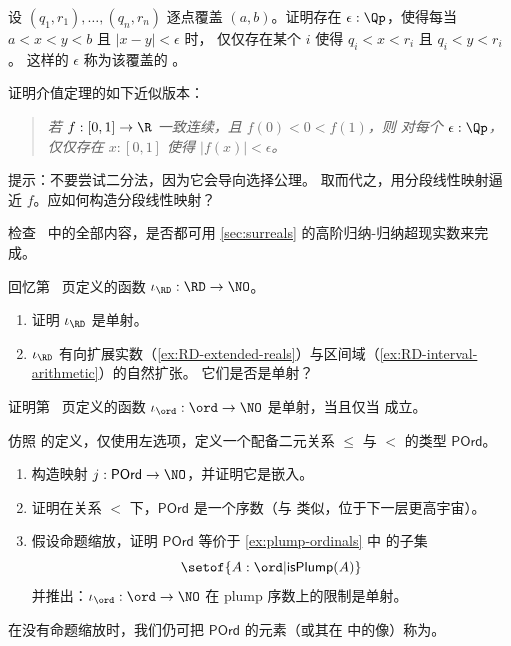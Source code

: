 \begin{ex} \label{ex:finite-cover-lebesgue-number}
  设 $(q_1, r_1), \ldots, (q_n, r_n)$ 逐点覆盖 $(a, b)$。证明存在
  $\epsilon : \Qp$，使得每当 $a < x < y < b$ 且 $|x - y| < \epsilon$ 时，
  仅仅存在某个 $i$ 使得 $q_i < x < r_i$ 且 $q_i < y < r_i$。
  这样的 $\epsilon$ 称为该覆盖的
  。
\end{ex}

\begin{ex} \label{ex:mean-value-theorem}
  证明介值定理的如下近似版本：
  \begin{quote}
    \emph{
      若 $f : [0,1] \to \R$ 一致连续，且 $f(0) < 0 < f(1)$，则
      对每个 $\epsilon : \Qp$，仅仅存在 $x : [0,1]$ 使得 $|f(x)| <
      \epsilon$。
    }
  \end{quote}
  提示：不要尝试二分法，因为它会导向选择公理。
  取而代之，用分段线性映射逼近 $f$。应如何构造分段线性映射？
\end{ex}

\begin{ex}\label{ex:knuth-surreal-check}
  检查~\cite{knuth74:_surreal_number} 中的全部内容，是否都可用 \cref{sec:surreals} 的高阶归纳-归纳超现实数来完成。
\end{ex}

\begin{ex}\label{ex:reals-into-surreals}
  回忆第~\pageref{reals-into-surreals} 页定义的函数 $\iota_{\RD}:\RD\to\NO$。
  \begin{enumerate}
  \item 证明 $\iota_{\RD}$ 是单射。
  \item $\iota_{\RD}$ 有向扩展实数（\cref{ex:RD-extended-reals}）与区间域（\cref{ex:RD-interval-arithmetic}）的自然扩张。
    它们是否是单射？
  \end{enumerate}
\end{ex}

\begin{ex}\label{ex:ord-into-surreals}
  证明第~\pageref{ord-into-surreals} 页定义的函数 $\iota_{\ord}:\ord\to\NO$ 是单射，当且仅当 \LEM{} 成立。
\end{ex}

\begin{ex}\label{ex:hiit-plump}
  仿照 \NO 的定义，仅使用左选项，定义一个配备二元关系 $\le$ 与 $<$ 的类型 $\mathsf{POrd}$。
  \begin{enumerate}
  \item 构造映射 $j:\mathsf{POrd} \to \NO$，并证明它是嵌入。
  \item 证明在关系 $<$ 下，$\mathsf{POrd}$ 是一个序数（与 \ord 类似，位于下一层更高宇宙）。
  \item 假设命题缩放，证明 $\mathsf{POrd}$ 等价于 \cref{ex:plump-ordinals} 中 \ord 的子集
    \[\setof{A:\ord | \mathsf{isPlump}(A)}\]
    并推出：$\iota_{\ord}:\ord\to\NO$ 在 plump 序数上的限制是单射。
  \end{enumerate}
  在没有命题缩放时，我们仍可把 $\mathsf{POrd}$ 的元素（或其在 \NO 中的像）称为。
\end{ex}

